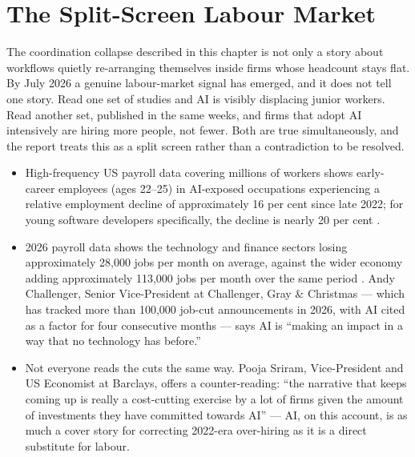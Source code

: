 \section{The Split-Screen Labour Market}
\label{sec:split-screen}

The coordination collapse described in this chapter is not only a story about workflows quietly re-arranging themselves inside firms whose headcount stays flat. By July 2026 a genuine labour-market signal has emerged, and it does not tell one story. Read one set of studies and AI is visibly displacing junior workers. Read another set, published in the same weeks, and firms that adopt AI intensively are hiring more people, not fewer. Both are true simultaneously, and the report treats this as a split screen rather than a contradiction to be resolved.

\begin{evidencebox}[title={Displacement Side: Where the Decline Is Concentrated}]
\begin{itemize}
  \item High-frequency US payroll data covering millions of workers shows early-career employees (ages 22--25) in AI-exposed occupations experiencing a relative employment decline of approximately 16 per cent since late 2022; for young software developers specifically, the decline is nearly 20 per cent \parencite{Brynjolfsson2025Canaries}.
  \item 2026 payroll data shows the technology and finance sectors losing approximately 28,000 jobs per month on average, against the wider economy adding approximately 113,000 jobs per month over the same period \parencite{Challenger2026}. Andy Challenger, Senior Vice-President at Challenger, Gray \& Christmas --- which has tracked more than 100,000 job-cut announcements in 2026, with AI cited as a factor for four consecutive months --- says AI is ``making an impact in a way that no technology has before.''
  \item Not everyone reads the cuts the same way. Pooja Sriram, Vice-President and US Economist at Barclays, offers a counter-reading: ``the narrative that keeps coming up is really a cost-cutting exercise by a lot of firms given the amount of investments they have committed towards AI'' --- AI, on this account, is as much a cover story for correcting 2022-era over-hiring as it is a direct substitute for labour.
\end{itemize}
\end{evidencebox}

